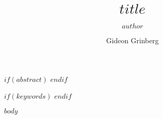 \documentclass[stu,12pt,floatsintext]{apa7}
\title{$title$}
\author{$author$}
\author{Gideon Grinberg}
\affiliation{$affiliation$}
\affiliation{}
\begin{document}
\maketitle

$if(abstract)$
$endif$

$if(keywords)$
$endif$

$body$
\end{document}
